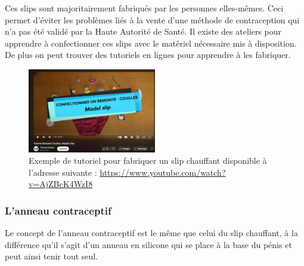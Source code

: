 \documentclass[12pt,a4paper]{report}
\begin{document}
Ces slips sont majoritairement fabriqués par les personnes elles-mêmes. Ceci permet d'éviter les problèmes liés à la vente d'une méthode de contraception qui n'a pas été validé par la Haute Autorité de Santé. \cites{MethodeThermique}{guillaumedaudinContraceptesEnqueteDernier2022}
Il existe des ateliers pour apprendre à confectionner ces slips avec le matériel nécessaire mis à disposition. \cites{ContraceptionMasculineComment2023}{guillaumedaudinContraceptesEnqueteDernier2022}
De plus on peut trouver des tutoriels en lignes pour apprendre à les fabriquer.

\begin{figure}[H]
    \centering
    \includegraphics[width=0.5\textwidth]{images/scientiphique/Tuto_slip_contraceptif.png}
    \caption{Exemple de tutoriel pour fabriquer un slip chauffant disponible à l'adresse suivante : \href{https://www.youtube.com/watch?v=AjZBcK4WzI8}{https://www.youtube.com/watch?v=AjZBcK4WzI8}}
    \label{fig:tuto_slip_chauffant}
\end{figure}

\subsubsection{L'anneau contraceptif}

Le concept de l'anneau contraceptif est le même que celui du slip chauffant, à la différence qu'il s'agit d'un anneau en silicone qui se place à la base du pénis et peut ainsi tenir tout seul.
\end{document}
